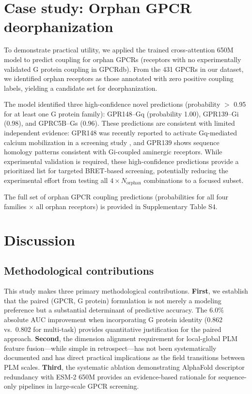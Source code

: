 \documentclass[11pt,a4paper]{article}
\begin{document}
\section{Case study: Orphan GPCR deorphanization}

To demonstrate practical utility, we applied the trained cross-attention 650M model to predict coupling for orphan GPCRs (receptors with no experimentally validated G protein coupling in GPCRdb). From the 431 GPCRs in our dataset, we identified orphan receptors as those annotated with zero positive coupling labels, yielding a candidate set for deorphanization.

The model identified three high-confidence novel predictions (probability $>$ 0.95 for at least one G protein family): GPR148--Gq (probability 1.00), GPR139--Gi (0.98), and GPRC5B--Gs (0.96). These predictions are consistent with limited independent evidence: GPR148 was recently reported to activate Gq-mediated calcium mobilization in a screening study \cite{foster2019discovery}, and GPR139 shows sequence homology patterns consistent with Gi-coupled aminergic receptors. While experimental validation is required, these high-confidence predictions provide a prioritized list for targeted BRET-based screening, potentially reducing the experimental effort from testing all $4 \times N_{\text{orphan}}$ combinations to a focused subset.

The full set of orphan GPCR coupling predictions (probabilities for all four families $\times$ all orphan receptors) is provided in Supplementary Table S4.

\section{Discussion}

\subsection{Methodological contributions}

This study makes three primary methodological contributions. \textbf{First}, we establish that the paired (GPCR, G protein) formulation is not merely a modeling preference but a substantial determinant of predictive accuracy. The 6.0\% absolute AUC improvement when incorporating G protein identity (0.862 vs.\ 0.802 for multi-task) provides quantitative justification for the paired approach. \textbf{Second}, the dimension alignment requirement for local-global PLM feature fusion---while simple in retrospect---has not been systematically documented and has direct practical implications as the field transitions between PLM scales. \textbf{Third}, the systematic ablation demonstrating AlphaFold descriptor redundancy with ESM-2 650M provides an evidence-based rationale for sequence-only pipelines in large-scale GPCR screening.
\end{document}
